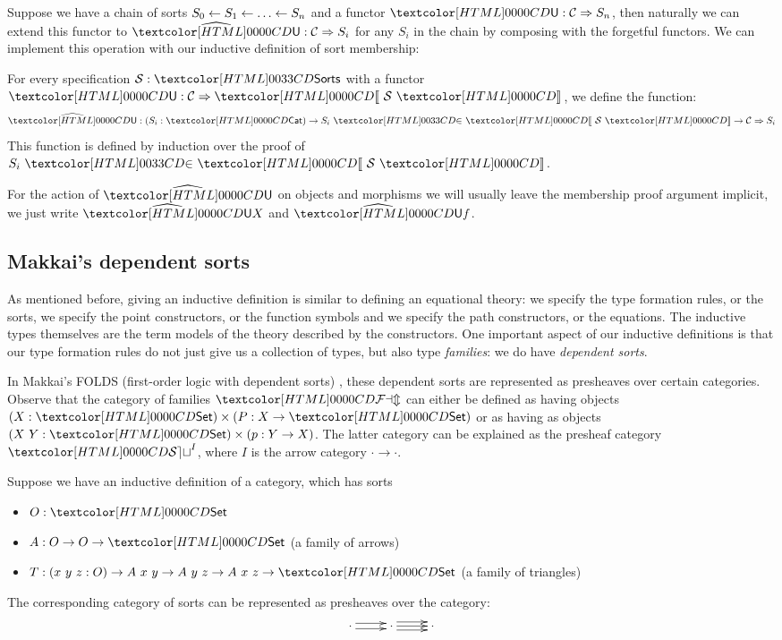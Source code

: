 Suppose we have a chain of sorts
$S_0 \leftarrow S_1 \leftarrow \hdots \leftarrow S_n$ and a functor
$\Und : \Func{\Cc}{S_n}$, then naturally we can extend this functor to
$\extendfunc{\Und} : \Func{\Cc}{S_i}$ for any $S_i$ in the chain by
composing with the forgetful functors. We can implement this operation
with our inductive definition of sort membership:

\begin{definition}
  For every specification $\Ss : \sortsty$ with a functor
  $\Und : \Func{\Cc}{\SortCat{\Ss}}$, we define the function:
  $$
  \extendfunc{\Und} : (S_i : \Cat) \to \sortsin{S_i}{\SortCat{\Ss}} \to
  \Func{\Cc}{S_i}
  $$
  This function is defined by induction over the proof of
  $\sortsin{S_i}{\SortCat{\Ss}}$. 

  For the action of $\extendfunc{\Und}$ on objects and morphisms we
  will usually leave the membership proof argument implicit, \eg we
  just write $\extendfunc{\Und} X$ and $\extendfunc{\Und} f$.
\end{definition}

\subsection{Makkai's dependent sorts}

As mentioned before, giving an inductive definition is similar to
defining an equational theory: we specify the type formation rules, or
the sorts, we specify the point constructors, or the function symbols
and we specify the path constructors, or the equations. The inductive
types themselves are the term models of the theory described by the
constructors. One important aspect of our inductive definitions is
that our type formation rules do not just give us a collection of
types, but also type \emph{families}: we do have \emph{dependent
  sorts}.

In Makkai's FOLDS (first-order logic with dependent sorts) \cite{Makkai1995}, these
dependent sorts are represented as presheaves over certain
categories. Observe that the category of families $\FAM$ can either be
defined as having objects $(X : \Set) \times (P : X \to \Set)$ or as
having as objects $(X\ Y : \Set) \times (p : Y \to X)$. The latter
category can be explained as the presheaf category $\SET^I$, where $I$
is the arrow category $\cdot \to \cdot$.

\begin{example}
  Suppose we have an inductive definition of a category, which has
  sorts
%
  \begin{itemize}
  \item $O : \Set$
  \item $A : O \to O \to \Set$ (a family of arrows)
  \item $T : (x\ y\ z : O) \to A\ x\ y \to A\ y\ z \to A\ x\ z \to \Set$
    (a family of triangles)
  \end{itemize}
%
  The corresponding category of sorts can be represented as presheaves
  over the category:
$$
\xymatrix{ \cdot \ar@<-.5ex>[r] \ar@<.5ex>[r] &\cdot \ar@<-.75ex>[r]
  \ar@<.0ex>[r] \ar@<.75ex>[r] &\cdot }
$$
\end{example}

